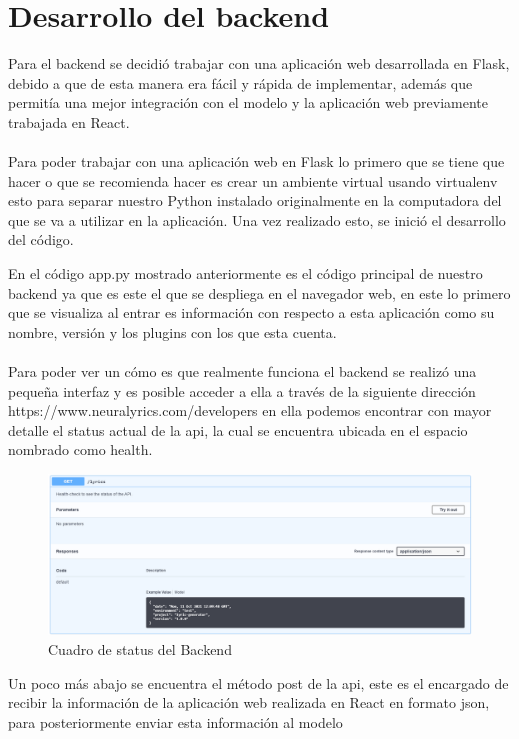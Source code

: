 \documentclass[12pt, a4paper, titlepage]{article}
\begin{document}
	\section{Desarrollo del backend}
	Para el backend se decidió trabajar con una aplicación web desarrollada en Flask, debido a que de esta manera era fácil y rápida de implementar, además que permitía una mejor integración con el modelo y la aplicación web previamente trabajada en React.\\\\
	Para poder trabajar con una aplicación web en Flask lo primero que se tiene que hacer o que se recomienda hacer es crear un ambiente virtual usando virtualenv esto para separar nuestro Python instalado originalmente en la computadora del que se va a utilizar en la aplicación. Una vez realizado esto, se inició el desarrollo del código.
	\begin{center}
		
	\end{center}
	En el código app.py mostrado anteriormente es el código principal de nuestro backend ya que es este el que se despliega en el navegador web, en este lo primero que se visualiza al entrar es información con respecto a esta aplicación como su nombre, versión y los plugins con los que esta cuenta.\\\\
	Para poder ver un cómo es que realmente funciona el backend se realizó una pequeña interfaz y es posible acceder a ella a través de la siguiente dirección https://www.neuralyrics.com/developers en ella podemos encontrar con mayor detalle el status actual de la api, la cual se encuentra ubicada en el espacio nombrado como health.
	\begin{figure}[H]
		\includegraphics[width=13.5cm]{./Imagenes/BackEnd/Health.png}
		\centering 
		\caption{Cuadro de status del Backend}
	\end{figure}
	Un poco más abajo se encuentra el método post de la api, este es el encargado de recibir la información de la aplicación web realizada en React en formato json, para posteriormente enviar esta información al modelo
\end{document}
